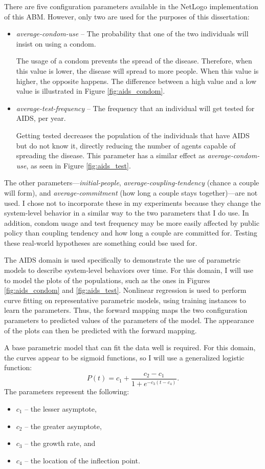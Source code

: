 There are five configuration parameters available in the NetLogo implementation of this ABM.
However, only two are used for the purposes of this dissertation:
\begin{itemize}
  \item \textit{average-condom-use} -- The probability that one of the two individuals will insist on using a condom.

The usage of a condom prevents the spread of the disease.
Therefore, when this value is lower, the disease will spread to more people.
When this value is higher, the opposite happens.
The difference between a high value and a low value is illustrated in Figure \ref{fig:aids_condom}.

  \item \textit{average-test-frequency} -- The frequency that an individual will get tested for AIDS, per year.

Getting tested decreases the population of the individuals that have AIDS but do not know it, directly reducing the number of agents capable of spreading the disease.
This parameter has a similar effect as \textit{average-condom-use}, as seen in Figure \ref{fig:aids_test}.
\end{itemize}
The other parameters---\textit{initial-people}, \textit{average-coupling-tendency} (chance a couple will form), and \textit{average-commitment} (how long a couple stays together)---are not used.
I chose not to incorporate these in my experiments because they change the system-level behavior in a similar way to the two parameters that I do use.
In addition, condom usage and test frequency may be more easily affected by public policy than coupling tendency and how long a couple are committed for.
Testing these real-world hypotheses are something \fw could bse used for.

The AIDS domain is used specifically to demonstrate the use of parametric models to describe system-level behaviors over time.
For this domain, I will use \fw to model the plots of the populations, such as the ones in Figures \ref{fig:aids_condom} and \ref{fig:aids_test}.
Nonlinear regression is used to perform curve fitting on representative parametric models, using training instances to learn the parameters.
Thus, the forward mapping maps the two configuration parameters to predicted values of the parameters of the model.
The appearance of the plots can then be predicted with the forward mapping.

A base parametric model that can fit the data well is required.
For this domain, the curves appear to be sigmoid functions, so I will use a generalized logistic function:
\[P(t) = c_1 + \displaystyle\frac{c_2 - c_1}{1 + e^{-c_3 (t - c_4)}}.\]
The parameters represent the following:
\begin{itemize}
 \item $c_1$ -- the lesser asymptote,
 \item $c_2$ -- the greater asymptote,
 \item $c_3$ -- the growth rate, and
 \item $c_4$ -- the location of the inflection point.
\end{itemize}

